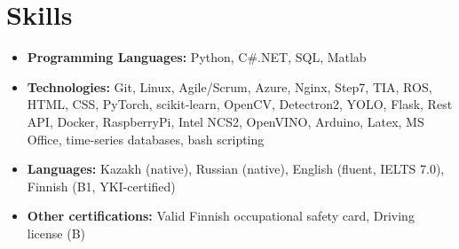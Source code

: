 \documentclass[a4paper,10pt]{article}
\begin{document}
\section*{Skills}
\begin{itemize}
    \item \textbf{Programming Languages:} Python, C\#.NET, SQL, Matlab
    \item \textbf{Technologies:} Git, Linux, Agile/Scrum, Azure, Nginx, Step7, TIA, ROS, HTML, CSS, PyTorch, scikit-learn, OpenCV, Detectron2, YOLO, Flask, Rest API, Docker, RaspberryPi, Intel NCS2, OpenVINO, Arduino, Latex, MS Office, time-series databases, bash scripting
    \item \textbf{Languages:} Kazakh (native), Russian (native), English (fluent, IELTS 7.0), Finnish (B1, YKI-certified)
    \item \textbf{Other certifications:} Valid Finnish occupational safety card, Driving license (B)
\end{itemize}
\end{document}
